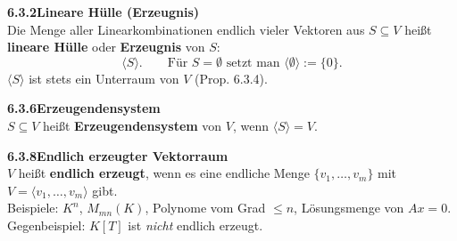 \documentclass[a4paper,12pt]{article}
\newcommand{\gentry}[3]{%
  \noindent\textbf{#1\quad #2}\nopagebreak\\[0.2em]
  #3\par\smallskip
}
\begin{document}
\gentry{6.3.2}{Lineare Hülle (Erzeugnis)}{%
  Die Menge aller Linearkombinationen endlich vieler Vektoren aus $S \subseteq V$
  heißt \textbf{lineare Hülle} oder \textbf{Erzeugnis} von $S$:
  \[
    \langle S \rangle. \qquad \text{Für } S = \emptyset \text{ setzt man } \langle \emptyset \rangle := \{0\}.
  \]
  $\langle S \rangle$ ist stets ein Unterraum von $V$ (Prop. 6.3.4).
}

\gentry{6.3.6}{Erzeugendensystem}{%
  $S \subseteq V$ heißt \textbf{Erzeugendensystem} von $V$, wenn $\langle S \rangle = V$.
}

\gentry{6.3.8}{Endlich erzeugter Vektorraum}{%
  $V$ heißt \textbf{endlich erzeugt}, wenn es eine endliche Menge
  $\{v_1,\ldots,v_m\}$ mit $V = \langle v_1,\ldots,v_m \rangle$ gibt.
  \smallskip\\
  Beispiele: $K^n$, $M_{mn}(K)$, Polynome vom Grad $\le n$, Lösungsmenge von $Ax=0$.
  \smallskip\\
  Gegenbeispiel: $K[T]$ ist \emph{nicht} endlich erzeugt.
}
\end{document}
